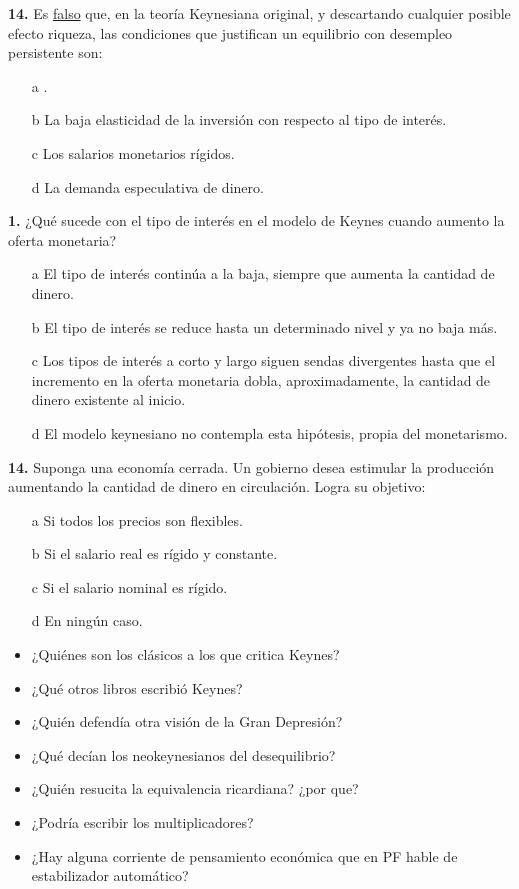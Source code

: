 \documentclass{nuevotema}
\begin{document}

\textbf{14.} Es \underline{falso} que, en la teoría Keynesiana original, y descartando cualquier posible efecto riqueza, las condiciones que justifican un equilibrio con desempleo persistente son:

\begin{enumerate}
	\item[a] .
	\item[b] La baja elasticidad de la inversión con respecto al tipo de interés.
	\item[c] Los salarios monetarios rígidos.
	\item[d] La demanda especulativa de dinero.
\end{enumerate}


\textbf{1.} ¿Qué sucede con el tipo de interés en el modelo de Keynes cuando aumento la oferta monetaria?

\begin{enumerate}
	\item[a] El tipo de interés continúa a la baja, siempre que aumenta la cantidad de dinero.
	\item[b] El tipo de interés se reduce hasta un determinado nivel y ya no baja más.
	\item[c] Los tipos de interés a corto y largo siguen sendas divergentes hasta que el incremento en la oferta monetaria dobla, aproximadamente, la cantidad de dinero existente al inicio.
	\item[d] El modelo keynesiano no contempla esta hipótesis, propia del monetarismo. 
\end{enumerate}

\textbf{14.} Suponga una economía cerrada. Un gobierno desea estimular la producción aumentando la cantidad de dinero en circulación. Logra su objetivo: 

\begin{enumerate}
	\item[a] Si todos los precios son flexibles.
	\item[b] Si el salario real es rígido y constante.
	\item[c] Si el salario nominal es rígido. 
	\item[d] En ningún caso.
\end{enumerate}

\begin{itemize}
    \item ¿Quiénes son los clásicos a los que critica Keynes?
    \item ¿Qué otros libros escribió Keynes?
    \item ¿Quién defendía otra visión de la Gran Depresión?
    \item ¿Qué decían los neokeynesianos del desequilibrio?
    \item ¿Quién resucita la equivalencia ricardiana? ¿por que?
    \item ¿Podría escribir los multiplicadores?
    \item ¿Hay alguna corriente de pensamiento económica que en PF hable de estabilizador automático?
\end{itemize}
\end{document}
